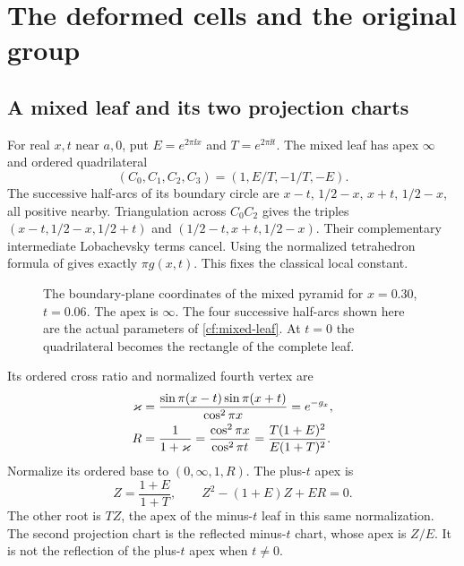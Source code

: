 \section{The deformed cells and the original group}
\label{cf:deformation}

\subsection{A mixed leaf and its two projection charts}
For real $x,t$ near $a,0$, put $E=e^{2\pi\ii x}$ and
$T=e^{2\pi\ii t}$. The mixed leaf has apex $\infty$ and ordered
quadrilateral
\begin{equation}\label{cf:mixed-leaf}
 (C_0,C_1,C_2,C_3)=(1,E/T,-1/T,-E).
\end{equation}
The successive half-arcs of its boundary circle are
$x-t,\,1/2-x,\,x+t,\,1/2-x$, all positive nearby.
Triangulation across $C_0C_2$ gives the triples
$(x-t,1/2-x,1/2+t)$ and
$(1/2-t,x+t,1/2-x)$.
Their complementary intermediate Lobachevsky terms cancel.
Using the normalized tetrahedron formula of
\cite[equation~(2.1)]{Geometry} gives exactly $\pi g(x,t)$.
This fixes the classical local constant.

\begin{figure}[ht]
\centering
\caption{The boundary-plane coordinates of the mixed pyramid for
$x=0.30$, $t=0.06$. The apex is $\infty$.
The four successive half-arcs shown here are the actual parameters
of \eqref{cf:mixed-leaf}. At $t=0$ the quadrilateral becomes the
rectangle of the complete leaf.}
\label{cf:leaf-figure}
\end{figure}

Its ordered cross ratio and normalized fourth vertex are
\begin{equation}\label{cf:R}
\begin{split}
 \varkappa&=\frac{\sin\pi(x-t)\sin\pi(x+t)}{\cos^2\pi x}
                       =e^{-g_x},\\
 R&=\frac1{1+\varkappa}
    =\frac{\cos^2\pi x}{\cos^2\pi t}
    =\frac{T(1+E)^2}{E(1+T)^2}.
\end{split}
\end{equation}
Normalize its ordered base to $(0,\infty,1,R)$.
The plus-$t$ apex is
\begin{equation}\label{cf:flags}
 Z=\frac{1+E}{1+T},\qquad
 Z^2-(1+E)Z+ER=0.
\end{equation}
The other root is $TZ$, the apex of the minus-$t$ leaf in this
same normalization. The second projection chart is the reflected
minus-$t$ chart, whose apex is $Z/E$. It is not the reflection
of the plus-$t$ apex when $t\ne0$.

